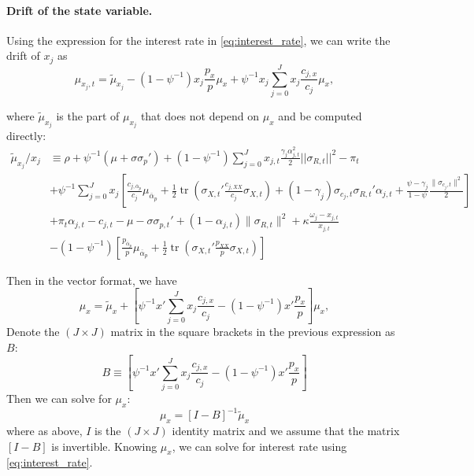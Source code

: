 \documentclass[12pt,english]{article}
\DeclareMathOperator{\tr}{tr}
\begin{document}
\paragraph{Drift of the state variable.}

Using the expression for the interest rate in \eqref{eq:interest_rate}, we can write the drift of $ x_j $ as 
\begin{equation}\label{eq:mu_xj}
	\mu_{x_j,t}=\widetilde{\mu}_{x_j}-\left(1-\psi^{-1}\right)x_j\frac{p_x}{p}\mu_x+\psi^{-1}x_j\sum_{j=0}^{J}x_j\frac{c_{j,x}}{c_j}\mu_x,
\end{equation}

where $ \widetilde{\mu}_{x_j} $ is the part of $ \mu_{x_j} $ that does not depend on $ \mu_x $ and be computed directly:
\begin{align*}
	\widetilde{\mu}_{x_j}/x_j&\equiv \rho+\psi^{-1}(\mu+\sigma\sigma_p')+ \left (1-\psi^{-1}\right )  \sum_{j=0}^J x_{j,t}\frac{\gamma_j \alpha_{j,t}^2}{2} ||\sigma_{R,t}||^2- \pi_t\nonumber\\
	& +\psi^{-1}\sum_{j=0}^Jx_j\left[\frac{c_{j,\overline{\alpha}_p}}{c_j}\mu_{\overline{\alpha}_p}+\frac{1}{2}\tr\left(\sigma_{X,t}'\frac{c_{j,XX}}{c_j}\sigma_{X,t}\right)+ (1-\gamma_j)  \sigma_{c_j,t} \sigma_{R,t}' \alpha_{j,t} + \frac{\psi - \gamma_j}{1-\psi} \frac{\|\sigma_{c_j,t}\|^2}{2}\right]\nonumber\\
	&+ \pi_t \alpha_{j,t} - c_{j,t} -\mu - \sigma \sigma_{p,t}'  +(1- \alpha_{j,t}) \|\sigma_{R,t}\|^2  +\kappa \frac{\omega_j-x_{j,t}}{x_{j,t}} \nonumber\\
	&-(1-\psi^{-1})\left[\frac{p_{\overline{\alpha}_p}}{p}\mu_{\overline{\alpha}_p}+\frac{1}{2}\tr\left(\sigma_{X,t}'\frac{p_{XX}}{p}\sigma_{X,t}\right)\right]
\end{align*}

Then in the vector format, we have
\begin{equation}\label{eq:mux}
	\mu_x=\widetilde{\mu}_x+\left[\psi^{-1}x'\sum_{j=0}^{J}x_j\frac{c_{j,x}}{c_j}-\left(1-\psi^{-1}\right)x'\frac{p_x}{p}\right]\mu_x,
\end{equation}
Denote the $ (J\times J) $ matrix in the square brackets in the previous expression as $ B $:
\begin{equation}
	B\equiv\left[\psi^{-1}x'\sum_{j=0}^{J}x_j\frac{c_{j,x}}{c_j}-\left(1-\psi^{-1}\right)x'\frac{p_x}{p}\right]
\end{equation}
Then we can solve for $ \mu_x $:
\begin{equation}\label{eq:mux2}
	\mu_x=\left[I-B\right]^{-1}\widetilde{\mu}_x
\end{equation}
where as above, $ I $ is the $ (J\times J) $ identity matrix and we assume that the matrix $\left[I-B\right]$ is invertible.
Knowing $ \mu_x $, we can solve for interest rate using \eqref{eq:interest_rate}.
\end{document}
